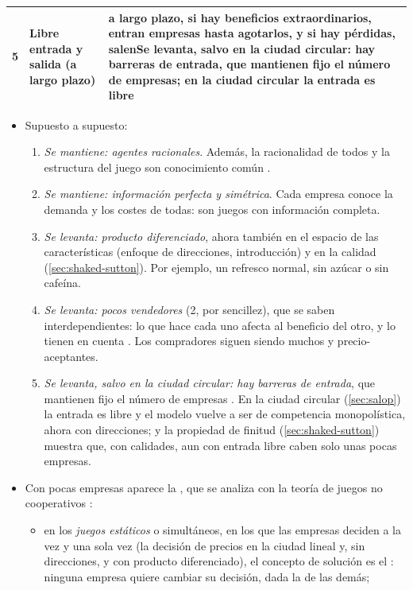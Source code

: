 \documentclass[11pt]{article}
\begin{document}
\begin{table}[H]
\begin{tabular}{>{\centering\arraybackslash}m{0.7cm}>{\raggedright\arraybackslash}m{4.3cm}>{\raggedright\arraybackslash}m{10.0cm}}
\addlinespace[0.3em]
\rowcolor{tceesalmon}\textcolor{tceemorado}{\textbf{5}} & \textbf{Libre entrada y salida (a largo plazo)} & a largo plazo, si hay beneficios extraordinarios, entran empresas hasta agotarlos, y si hay pérdidas, salen\newline \textcolor{tceerojo}{\textbf{Se levanta, salvo en la ciudad circular}}: hay \textbf{barreras de entrada}, que mantienen fijo el número de empresas; en la ciudad circular la entrada es libre\\
\bottomrule
\end{tabular}
\end{table}

\begin{itemize}
\item Supuesto a supuesto:
  \begin{enumerate}
  \item \emph{Se mantiene: agentes racionales}. Además, la racionalidad de todos y la estructura del juego son conocimiento común .
  \item \emph{Se mantiene: información perfecta y simétrica}. Cada empresa conoce la demanda y los costes de todas: son juegos con información completa.
  \item \emph{Se levanta: producto diferenciado}, ahora también en el espacio de las características (enfoque de direcciones, introducción) y en la calidad (\ref{sec:shaked-sutton}). Por ejemplo, un refresco normal, sin azúcar o sin cafeína.
  \item \emph{Se levanta: pocos vendedores} (2, por sencillez), que se saben interdependientes: lo que hace cada uno afecta al beneficio del otro, y lo tienen en cuenta . Los compradores siguen siendo muchos y precio-aceptantes.
  \item \emph{Se levanta, salvo en la ciudad circular: hay barreras de entrada}, que mantienen fijo el número de empresas . En la ciudad circular (\ref{sec:salop}) la entrada es libre y el modelo vuelve a ser de competencia monopolística, ahora con direcciones; y la propiedad de finitud (\ref{sec:shaked-sutton}) muestra que, con calidades, aun con entrada libre caben solo unas pocas empresas.
  \end{enumerate}
\item Con pocas empresas aparece la , que se analiza con la teoría de juegos no cooperativos :
  \begin{itemize}
  \item en los \emph{juegos estáticos} o simultáneos, en los que las empresas deciden a la vez y una sola vez (la decisión de precios en la ciudad lineal y, sin direcciones,  y  con producto diferenciado), el concepto de solución es el : ninguna empresa quiere cambiar su decisión, dada la de las demás;

\end{itemize}
\end{itemize}
\end{document}
